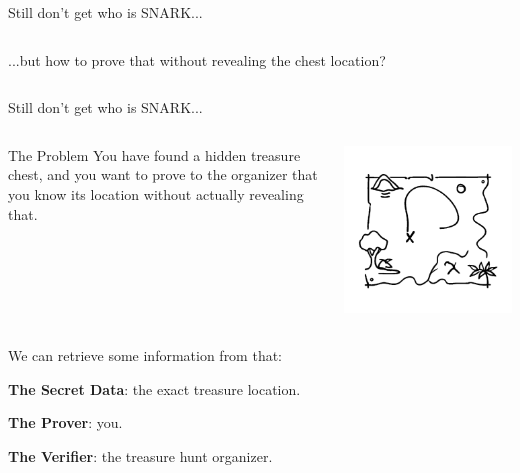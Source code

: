 \documentclass{zkdl-presentation-template}
\begin{document}
\begin{frame}{Still don't get who is SNARK...}
\begin{columns}
            \begin{column}{0.7\textwidth}
                ...but how to prove that without revealing the chest location?
            \end{column}
        \end{columns}
    \end{frame}

    \begin{frame}{Still don't get who is SNARK...}
        \begin{columns}
            \begin{column}{0.65\textwidth}
                \begin{block}{The Problem}
                You have found a hidden treasure chest, and you want to 
                prove to the organizer that you know its location without actually revealing that.
                \end{block}
            \end{column}

            \begin{column}{0.3\textwidth}
                \includegraphics[width=\textwidth]{../presentations/images/lecture_8/treasurelocation.png}
            \end{column}
        \end{columns}

        

        We can retrieve some information from that:

        \vspace{0.1cm}
        \textbf{The Secret Data}: the exact treasure location.

        \vspace{0.1cm}
        \textbf{The Prover}: you.

        \vspace{0.1cm}
        \textbf{The Verifier}: the treasure hunt organizer.
    \end{frame}
\end{document}
